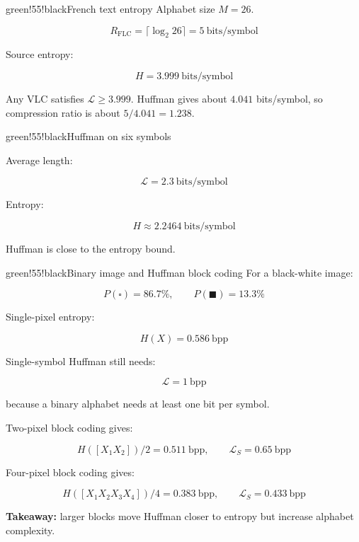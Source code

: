 \begin{calloutbox}{green!55!black}{French text entropy}
Alphabet size $M=26$.

\[
R_{\mathrm{FLC}}=\lceil\log_2 26\rceil=5\ \text{bits/symbol}
\]

Source entropy:

\[
H=3.999\ \text{bits/symbol}
\]

Any VLC satisfies $\mathcal{L}\geq3.999$. Huffman gives about $4.041$ bits/symbol, so compression ratio is about $5/4.041=1.238$.
\end{calloutbox}

\begin{calloutbox}{green!55!black}{Huffman on six symbols}
\begin{center}
\end{center}

Average length:

\[
\mathcal{L}=2.3\ \text{bits/symbol}
\]

Entropy:

\[
H\approx2.2464\ \text{bits/symbol}
\]

Huffman is close to the entropy bound.
\end{calloutbox}

\begin{calloutbox}{green!55!black}{Binary image and Huffman block coding}
For a black-white image:

\[
P(\square)=86.7\%,\qquad P(\blacksquare)=13.3\%
\]

Single-pixel entropy:

\[
H(X)=0.586\ \text{bpp}
\]

Single-symbol Huffman still needs:

\[
\mathcal{L}=1\ \text{bpp}
\]

because a binary alphabet needs at least one bit per symbol.

Two-pixel block coding gives:

\[
H([X_1X_2])/2=0.511\ \text{bpp},\qquad
\mathcal{L}_S=0.65\ \text{bpp}
\]

Four-pixel block coding gives:

\[
H([X_1X_2X_3X_4])/4=0.383\ \text{bpp},\qquad
\mathcal{L}_S=0.433\ \text{bpp}
\]

\textbf{Takeaway:} larger blocks move Huffman closer to entropy but increase alphabet complexity.
\end{calloutbox}

